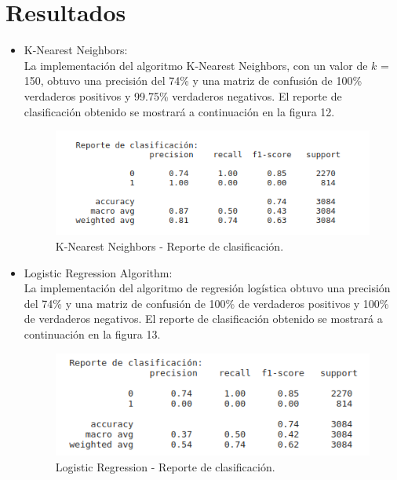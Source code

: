 \documentclass[spanish,12pt,letterpaper]{article}
\begin{document}
\section{Resultados}
\begin{itemize}
    \item K-Nearest Neighbors:\\
    La implementación del algoritmo K-Nearest Neighbors, con un valor de $k$ = 150, obtuvo una precisión del 74\% y una matriz de confusión de 100\% verdaderos positivos y 99.75\% verdaderos negativos. El reporte de clasificación obtenido se mostrará a continuación en la figura 12. 
    \begin{figure}[H]
        \centering
        \includegraphics[width=1\columnwidth]{KNN_RC.png}
        \caption{K-Nearest Neighbors - Reporte de clasificación.}
        \label{fig:comand}%
    \end{figure}
    
    \item Logistic Regression Algorithm:\\
        La implementación del algoritmo de regresión logística obtuvo una precisión del 74\% y una matriz de confusión de 100\% de verdaderos positivos y 100\% de verdaderos negativos. El reporte de clasificación obtenido se mostrará a continuación en la figura 13. 
    \begin{figure}[H]
        \centering
        \includegraphics[width=1\columnwidth]{LR_RC.png}
        \caption{Logistic Regression - Reporte de clasificación.}
        \label{fig:comand}%
    \end{figure}
    

\end{itemize}
\end{document}
